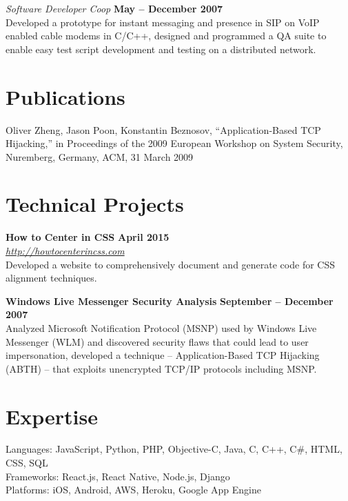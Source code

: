 \documentclass[margin,line]{resume}
\begin{document}
\begin{resume}
	\textsl{Software Developer Coop} \hfill
	\textbf{May -- December 2007}\\
	Developed a prototype for instant messaging and presence in SIP on VoIP
	enabled cable modems in C/C++, designed and programmed a QA suite to enable
	easy test script development and testing on a distributed network.

	\section{\mysidestyle Publications}

	Oliver Zheng, Jason Poon, Konstantin Beznosov, ``Application-Based TCP
	Hijacking,'' in Proceedings of the 2009 European Workshop on System
	Security, Nuremberg, Germany, ACM, 31 March 2009

	\section{\mysidestyle Technical Projects}

	\textbf{How to Center in CSS} \hfill
	\textbf{April 2015} \vspace{2mm}\\\vspace{1mm}%
	\textsl{\href{http://howtocenterincss.com/}{http://howtocenterincss.com}}
		\vspace{2mm}\\\vspace{1mm}%
	Developed a website to comprehensively document and generate code for CSS
	alignment techniques.

	\textbf{Windows Live Messenger Security Analysis} \hfill
	\textbf{September -- December 2007} \vspace{2mm}\\\vspace{1mm}%
	Analyzed Microsoft Notification Protocol (MSNP) used by Windows Live
	Messenger (WLM) and discovered security flaws that could lead to user
	impersonation, developed a technique -- Application-Based TCP Hijacking
	(ABTH) -- that exploits unencrypted TCP/IP protocols including MSNP.

	\section{\mysidestyle Expertise}
	Languages: JavaScript, Python, PHP, Objective-C, Java, C, C++, C{\#}, HTML,
	CSS, SQL
		\vspace{1mm}\\
	Frameworks: React.js, React Native, Node.js, Django
		\vspace{1mm}\\
	Platforms: iOS, Android, AWS, Heroku, Google App Engine


\end{resume}
\end{document}
